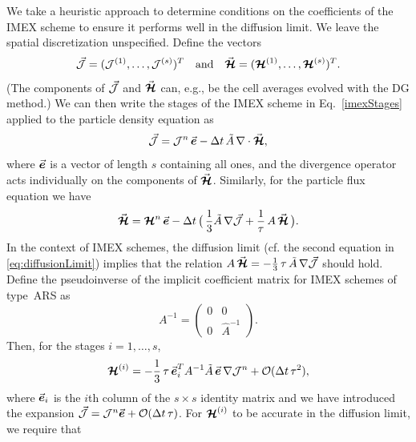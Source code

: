 We take a heuristic approach to determine conditions on the coefficients of the IMEX scheme to ensure it performs well in the diffusion limit.  
We leave the spatial discretization unspecified.  
Define the vectors 
\begin{equation}
  \vec{\mathcal{J}}=(\mathcal{J}^{(1)},\ldots,\mathcal{J}^{(s)})^{T}
  \quad\text{and}\quad
  \vec{\boldsymbol{\mathcal{H}}}=(\boldsymbol{\mathcal{H}}^{(1)},\ldots,\boldsymbol{\mathcal{H}}^{(s)})^{T}.  
\end{equation}
(The components of $\vec{\mathcal{J}}$ and $\vec{\boldsymbol{\mathcal{H}}}$ can, e.g., be the cell averages evolved with the DG method.)  
We can then write the stages of the IMEX scheme in Eq.~\eqref{imexStages} applied to the particle density equation as
\begin{equation}
  \vec{\mathcal{J}}=\mathcal{J}^{n}\,\vec{\boldsymbol{e}} - \Delta t\,\tilde{A}\,\nabla\cdot\vec{\boldsymbol{\mathcal{H}}}, 
  \label{eq:numberDensityIMEX}
\end{equation}
where $\vec{\boldsymbol{e}}$ is a vector of length $s$ containing all ones, and the divergence operator acts individually on the components of $\vec{\boldsymbol{\mathcal{H}}}$.  
Similarly, for the particle flux equation we have
\begin{equation}
  \vec{\boldsymbol{\mathcal{H}}}=\boldsymbol{\mathcal{H}}^{n}\,\vec{\boldsymbol{e}}-\Delta t\,\big(\,\frac{1}{3}\tilde{A}\,\nabla\vec{\mathcal{J}}+\frac{1}{\tau}\,A\,\vec{\boldsymbol{\mathcal{H}}}\,\big).
  \label{eq:numberFluxIMEX}
\end{equation}
In the context of IMEX schemes, the diffusion limit (cf. the second equation in \eqref{eq:diffusionLimit}) implies that the relation $A\,\vec{\boldsymbol{\mathcal{H}}}=-\frac{1}{3}\,\tau\,\tilde{A}\,\nabla\vec{\mathcal{J}}$ should hold.  
Define the pseudoinverse of the implicit coefficient matrix for IMEX schemes of type~ARS as
\begin{equation*}
    A^{-1}
    =\left(
        \begin{matrix}
          0 & 0 \\ 
          0 & \hat{A}^{-1}
        \end{matrix}
      \right).
\end{equation*}
Then, for the stages $i=1,\ldots,s$, 
\begin{equation}
  \boldsymbol{\mathcal{H}}^{(i)}=-\frac{1}{3}\,\tau\,\vec{\boldsymbol{e}}_{i}^{T}A^{-1}\tilde{A}\,\vec{\boldsymbol{e}}\,\nabla\mathcal{J}^{n}+\mathcal{O}(\Delta t\,\tau^{2}),
\end{equation}
where $\vec{\boldsymbol{e}}_{i}$ is the $i$th column of the $s\times s$ identity matrix and we have introduced the expansion $\vec{\mathcal{J}}=\mathcal{J}^{n}\vec{\boldsymbol{e}}+\mathcal{O}(\Delta t\,\tau)$.  
For $\boldsymbol{\mathcal{H}}^{(i)}$ to be accurate in the diffusion limit, we require that
